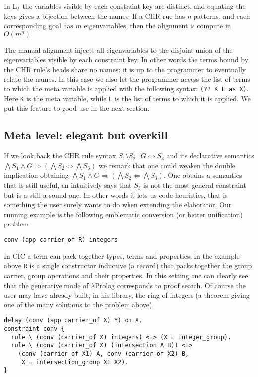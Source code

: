 \documentclass{easychair}
\begin{document}
In L$_\lambda$ the variables visible by each constraint key are distinct,
and equating the keys gives a bijection between the names.
If a CHR rue has $n$ patterns, and each corresponding goal has $m$
eigenvariables, then the alignment is compute in $O(m^n)$

The manual alignment injects all eigenvariables to the disjoint union
of the eigenvariables visible by each constraint key.  In other words
the terms bound by the CHR rule's heads share no names: it is
up to the programmer to eventually relate the names.
In this case we also let the programmer access the list of terms
to which the meta variable is applied with the following syntax:
\verb+(?? K L as X)+.  Here \verb+K+ is the meta variable, while
\verb+L+ is the list of terms to which it is applied.  We put this
feature to good use in the next section.

\subsection{Meta level: elegant but overkill}

If we look back the CHR rule syntax
$S_1 \setminus S_2 ~|~ G \iff S_3$ and its
declarative semantics $\bigwedge S_1 \wedge G \Rightarrow (\bigwedge
S_2 \iff \bigwedge S_3)$ we remark that one could
weaken the double implication obtaining
 $\bigwedge S_1 \wedge G \Rightarrow (\bigwedge
S_2 \Leftarrow \bigwedge S_3)$.  One obtains a semantics that
is still useful, an intuitively says that $S_3$ is not the most general
constraint but is a still a sound one.  In other words it lets
us code heuristics, that is something the user surely wants to
do when extending the elaborator.  Our running example
is the following emblematic conversion (or better unification) problem

\begin{verbatim}
conv (app carrier_of R) integers
\end{verbatim}

In CIC a term can pack together types, terms and properties.  In the
example above \verb+R+ is a single constructor inductive (a record)
that packs together the group carrier, group operations and their properties.
In this setting one can clearly see that the generative mode of $\lambda$Prolog corresponds to proof search.  Of course the user may have already built,
in his library, the ring of integers (a theorem giving one of the many
solutions to the problem above).

\begin{verbatim}
delay (conv (app carrier_of X) Y) on X.
constraint conv {
  rule \ (conv (carrier_of X) integers) <=> (X = integer_group).
  rule \ (conv (carrier_of X) (intersection A B)) <=>
    (conv (carrier_of X1) A, conv (carrier_of X2) B,
     X = intersection_group X1 X2).
}
\end{verbatim}
\end{document}

